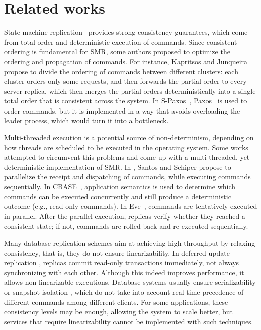 \chapter[Related works]{Related works}
\label{sec:rw}

State machine replication~\cite{Kapritsos:2012um, Kotla:2004ep, Lam78,
santos2013htsmr, Sch90} provides strong consistency guarantees, which come from
total order and deterministic execution of commands.
Since consistent ordering is fundamental for SMR, some authors proposed to
optimize the ordering and propagation of commands.
For instance, Kapritsos and Junqueira~\cite{kapritsos2010scalable} propose to
divide the ordering of commands between different clusters: each cluster orders
only some requests, and then forwards the partial order to every server replica,
which then merges the partial orders deterministically into a single total order
that is consistent across the system. In S-Paxos~\cite{biely2012spaxos},
Paxos~\cite{Lam98} is used to order commands, but it is implemented in
a way that avoids overloading the leader process, which would turn it into a
bottleneck.

Multi-threaded execution is a potential source of non-determinism, depending on
how threads are scheduled to be executed in the operating system. Some works
attempted to circumvent this problems and come up with a multi-threaded, yet
deterministic implementation of SMR. In \cite{santos2013htsmr}, Santos and
Schiper propose to parallelize the receipt and dispatching of commands, while
executing commands sequentially. In CBASE~\cite{Kotla:2004ep}, application
semantics is used to determine which commands can be executed concurrently and
still produce a deterministic outcome (e.g., read-only commands). In
Eve~\cite{Kapritsos:2012um}, commands are tentatively executed in parallel.
After the parallel execution, replicas verify whether they reached a consistent
state; if not, commands are rolled back and re-executed sequentially.

Many database replication schemes aim at achieving high throughput by relaxing
consistency, that is, they do not ensure linearizability. In deferred-update
replication \cite{chundi96dur, kobus2013hybrid, sciascia2012sdur, SousaOMP01},
replicas commit read-only transactions immediately, not always synchronizing
with each other. Although this indeed improves performance, it allows
non-linearizable executions. Database systems usually ensure serializability
\cite{BHG87} or snapshot isolation \cite{LinKJPA09}, which do not take into
account real-time precedence of different commands among different clients. For
some applications, these consistency levels may be enough, allowing the system
to scale better, but services that require linearizability cannot be implemented
with such techniques.

